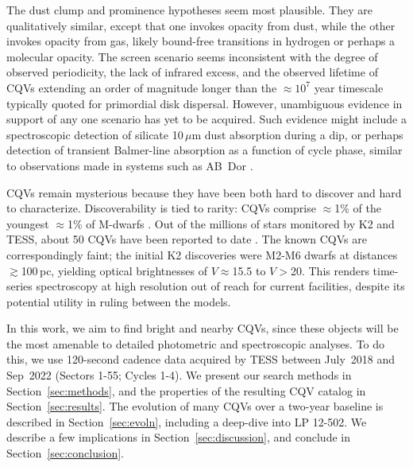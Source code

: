 \documentclass[11pt,twocolumn,tighten]{aastex63}
\begin{document}
The dust clump and prominence hypotheses seem most plausible.  They
are qualitatively similar, except that one invokes opacity from dust,
while the other invokes opacity from gas, likely bound-free
transitions in hydrogen or perhaps a molecular opacity.  The screen
scenario seems inconsistent with the degree of observed periodicity,
the lack of infrared excess, and the observed lifetime of CQVs
extending an order of magnitude longer than the $\approx$$10^7$ year
timescale typically quoted for primordial disk dispersal.
However, unambiguous evidence in support of any one scenario has yet
to be acquired.  Such evidence might include a spectroscopic detection
of silicate 10\,$\mu$m dust absorption during a dip, or perhaps
detection of transient Balmer-line absorption as a function of cycle
phase, similar to observations made in systems such as AB~Dor
\citep[see the review by][]{1999ASPC..158..146C}.

CQVs remain mysterious because they have been both hard to discover
and hard to characterize.   Discoverability is tied to rarity: CQVs
comprise $\approx$1\% of the youngest $\approx$1\% of M-dwarfs
\citep{2018AJ....155..196R}.  Out of the millions of stars monitored
by K2 and TESS, about 50 CQVs have been reported to date
\citep{2016AJ....152..114R,2017AJ....153..152S,2018AJ....155...63S,2019ApJ...876..127Z,2020AJ....160...86B,2022AJ....163..144G,2023ApJ...945..114P}.
The known CQVs are correspondingly faint; the initial K2 discoveries
\citep{2016AJ....152..114R,2017AJ....153..152S} were M2-M6 dwarfs at
distances $\gtrsim$100\,pc, yielding optical brightnesses of
$V$$\approx$15.5 to $V$$>$20.  This renders time-series spectroscopy
at high resolution out of reach for current facilities, despite its
potential utility in ruling between the models.

In this work, we aim to find bright and nearby CQVs, since these
objects will be the most amenable to detailed photometric and
spectroscopic analyses.  To do this, we use 120-second cadence data
acquired by TESS between July~2018 and Sep~2022 (Sectors 1-55; Cycles
1-4).  We present our search methods in Section~\ref{sec:methods}, and
the properties of the resulting CQV catalog in
Section~\ref{sec:results}.  The evolution of many CQVs over a two-year
baseline is described in Section~\ref{sec:evoln}, including a
deep-dive into LP 12-502.  We describe a few implications in
Section~\ref{sec:discussion}, and conclude in
Section~\ref{sec:conclusion}.
\end{document}
